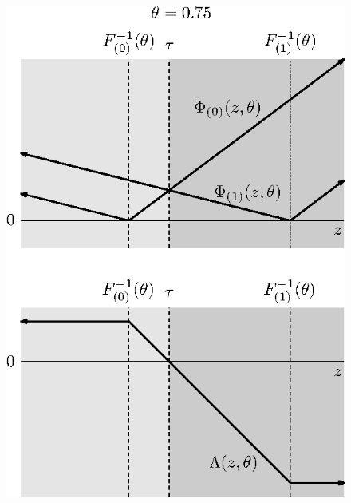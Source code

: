 \begin{figure}[h]
\begin{minipage}[t]{0.49\linewidth}
    \includegraphics{phi-lambda-0-75}
  \end{minipage}
  
\end{figure}


